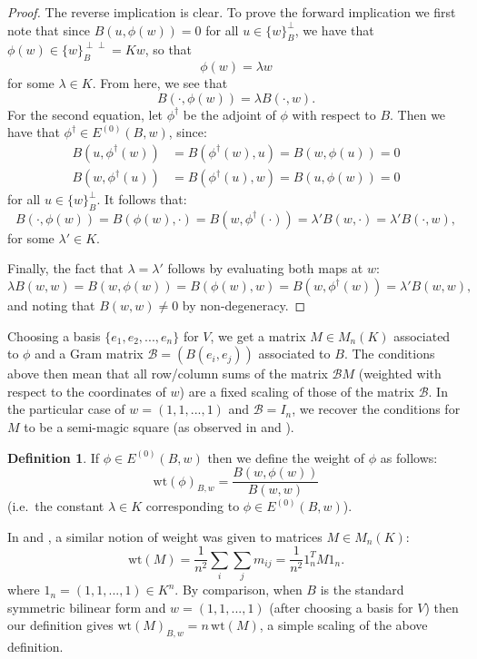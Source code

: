 \documentclass{amsart}
\theoremstyle{plain}
\theoremstyle{definition}
\newtheorem{defn}[theorem]{Definition}
\begin{document}
\begin{proof}
The reverse implication is clear. To prove the forward implication we first note that since $B(u,\phi(w)) =0$ for all $u \in \{w\}_B^\perp$, we have that $\phi(w) \in \{w\}_B^{\perp \perp}=Kw$, so that
\begin{equation*}
    \phi(w)=\lambda w
\end{equation*}
for some $\lambda \in K$. From here, we see that 
\begin{equation*}
    B(\cdot,\phi(w)) = \lambda B(\cdot,w).
\end{equation*}
For the second equation, let $\phi^\dagger$ be the adjoint of $\phi$ with respect to $B$. Then we have that $\phi^\dagger\in E^{(0)}(B,w)$, since: \begin{align*}B(u,\phi^\dagger(w)) &= B(\phi^\dagger(w),u) = B(w,\phi(u)) = 0\\ B(w,\phi^\dagger(u)) &= B(\phi^\dagger(u),w) = B(u,\phi(w)) = 0\end{align*} for all $u\in\{w\}_B^{\perp}$. It follows that: \[B(\cdot, \phi(w)) = B(\phi(w), \cdot) = B(w, \phi^\dagger(\cdot)) = \lambda' B(w,\cdot) = \lambda' B(\cdot, w),\] for some $\lambda'\in K$.

Finally, the fact that $\lambda = \lambda'$ follows by evaluating both maps at $w$: \[\lambda B(w,w) = B(w,\phi(w)) = B(\phi(w),w) = B(w,\phi^\dagger(w)) = \lambda' B(w,w),\] and noting that $B(w,w)\neq 0$ by non-degeneracy.
\end{proof}

Choosing a basis $\{e_1, e_2, ..., e_n\}$ for $V$, we get a matrix $M\in M_n(K)$ associated to $\phi$ and a Gram matrix $\mathcal{B} = (B(e_i,e_j))$ associated to $B$. The conditions above then mean that all row/column sums of the matrix $\mathcal{B}M$ (weighted with respect to the coordinates of $w$) are a fixed scaling of those of the matrix $\mathcal{B}$. In the particular case of $w = (1,1,...,1)$ and $\mathcal{B}=I_n$, we recover the conditions for $M$ to be a semi-magic square (as observed in \cite{higham} and \cite{lettington}).

\begin{defn}
If $\phi\in E^{(0)}(B,w)$ then we define the weight of $\phi$ as follows: \[\text{wt}(\phi)_{B,w} = \frac{B(w,\phi(w))}{B(w,w)}\]
(i.e.\ the constant $\lambda\in K$ corresponding to $\phi\in E^{(0)}(B,w)$).
\end{defn} 

In \cite{higham} and \cite{lettington}, a similar notion of weight was given to matrices $M\in M_n(K)$:
\begin{equation*}
    \text{wt}(M)=\frac{1}{n^2}\sum_i\sum_j m_{ij}=\frac{1}{n^2} 1_n^T M1_n.
\end{equation*}
where $1_n = (1,1,...,1)\in K^n$. By comparison, when $B$ is the standard symmetric bilinear form and $w = (1,1,...,1)$ (after choosing a basis for $V$) then our definition gives $\text{wt}(M)_{B,w} = n\,\text{wt}(M)$, a simple scaling of the above definition.
\end{document}
